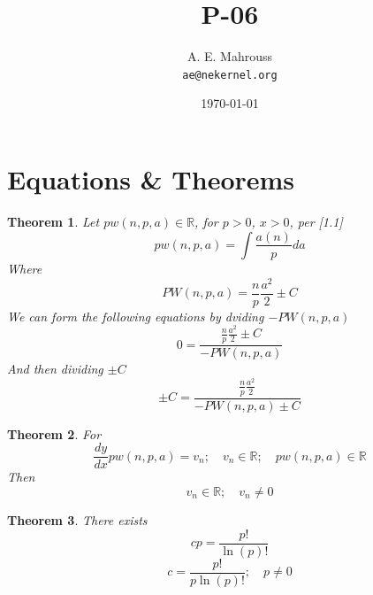 \documentclass[11pt, a4paper]{article}
\title{P-06}
\author{A. E. Mahrouss\\\texttt{ae@nekernel.org}}
\date{\today}
\theoremstyle{plain}
\newtheorem{theorem}{Theorem}[section]
\theoremstyle{definition}
\theoremstyle{remark}
\begin{document}
\twocolumn[{%
  \maketitle
  \vspace{-0.5em}
  \vspace{0.8em}
  \rule{\linewidth}{0.4pt}
  \vspace{1em}
}]

\maketitle

\section{Equations \& Theorems}

\begin{theorem}
  Let $pw(n, p, a) \in \mathbb{R}$, for $p > 0$, $x > 0$, per [1.1]
  \begin{equation}
    pw(n, p, a) = \int \frac{a(n)}{p} da
  \end{equation}
  Where
  \begin{equation}
    PW(n, p, a) = \frac{n}{p} \frac{a^2}{2}\pm C
  \end{equation}
  We can form the following equations by dviding $-PW(n, p, a)$
  \begin{equation}
    0 = \frac{\frac{n}{p} \frac{a^2}{2}\pm C}{-PW(n, p, a)}
  \end{equation}
  And then dividing $\pm C$
  \begin{equation}
    \pm C = \frac{\frac{n}{p} \frac{a^2}{2}}{-PW(n, p, a)\pm C}
  \end{equation}
\end{theorem}

\begin{theorem}
  For
  \begin{equation}
    \frac{dy}{dx}pw(n, p, a) = v_{n}; \quad v_{n} \in \mathbb{R}; \quad pw(n, p, a) \in \mathbb{R}
  \end{equation}
  Then
  \begin{equation}
    v_{n} \in \mathbb{R}; \quad v_{n}\neq 0
  \end{equation}
\end{theorem}

\begin{theorem}
  There exists
  \begin{equation}
    cp = \frac{p!}{\ln \left(p\right)!}
  \end{equation}
  \begin{equation}
    c = \frac{p!}{p\ln \left(p\right)!}; \quad p \neq 0
  \end{equation}
\end{theorem}
\end{document}
